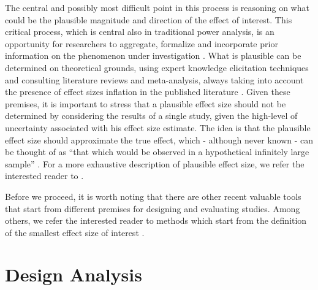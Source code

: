 \documentclass{article}\usepackage[]{graphicx}\usepackage[]{color}
\begin{document}
The central and possibly most difficult point in this process is reasoning on what could be the plausible magnitude and direction of the effect of interest. This critical process, which is central also in traditional power analysis, is an opportunity for researchers to aggregate, formalize and incorporate prior information on the phenomenon under investigation \parencite{gelmanPowerCalculationsAssessing2014}. What is plausible can be determined on theoretical grounds, using expert knowledge elicitation techniques \parencite[see for example][]{ohaganExpertKnowledgeElicitation2019} and consulting literature reviews and meta-analysis, always taking into account the presence of effect sizes inflation in the published literature \parencite{andersonBestOftForgotten2019}. Given these premises, it is important to stress that a plausible effect size should not be determined by considering the results of a single study, given the high-level of uncertainty associated with his effect size estimate. The idea is that the plausible effect size should approximate the true effect, which - although never known - can be thought of as “that which would be observed in a hypothetical infinitely large sample” \parencite[p. 642]{gelmanPowerCalculationsAssessing2014}. For a more exhaustive description of plausible effect size, we refer the interested reader to \textcite{altoeEnhancingStatisticalInference2020, gelmanPowerCalculationsAssessing2014}.

Before we proceed, it is worth noting that there are other recent valuable tools that start from different premises for designing and evaluating studies. Among others, we refer the interested reader to methods which start from the definition of the smallest effect size of interest \parencite[SESOI; for a tutorial, see][]{lakensEquivalenceTestingPsychological2018}.


\section{Design Analysis}
\end{document}
